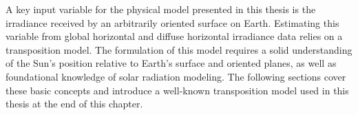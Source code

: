 A key input variable for the physical model presented in this thesis
is the irradiance received by an arbitrarily oriented surface on Earth.
Estimating this variable from global horizontal and diffuse horizontal
irradiance data relies on a transposition model. The
formulation of this model requires a solid understanding of the
Sun's position relative to Earth's surface
and oriented planes, as well as foundational knowledge of solar
radiation modeling. The following sections cover these basic concepts
and introduce a well-known transposition model used in this
thesis at the end of this chapter.
